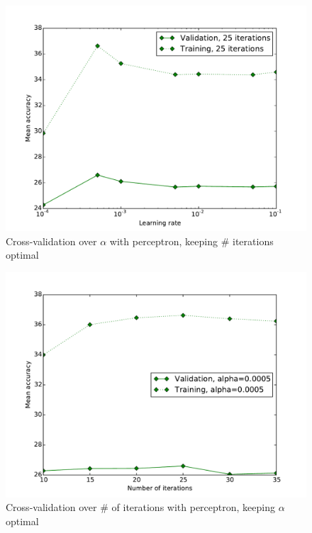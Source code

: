 \documentclass{acm_proc_article-sp}
\begin{document}
\begin{figure}[h!]
	\centering
	\includegraphics[width=\linewidth]{perceptron_learningrate}
  	\caption{Cross-validation over $\alpha$ with perceptron, keeping \# iterations optimal}
  	\label{fig:perc-learningrate}
\end{figure}
\begin{figure}[h!]
	\centering
	\includegraphics[width=\linewidth]{perceptron_iterations}
  	\caption{Cross-validation over \# of iterations with perceptron, keeping $\alpha$ optimal}
  	\label{fig:perc-iterations}
\end{figure}
\end{document}
